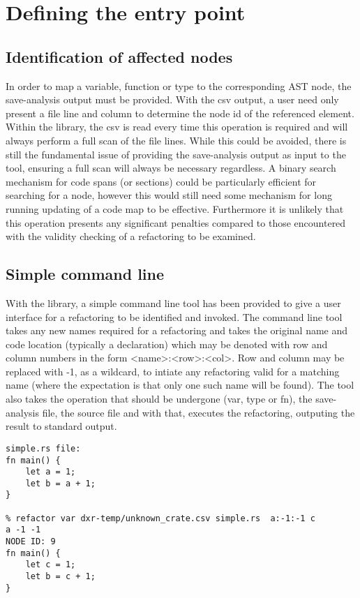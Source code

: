 
\section{Defining the entry point}
\subsection{Identification of affected nodes}
In order to map a variable, function or type to the corresponding AST node, the save-analysis output must be provided. With the csv output, a user need only present a file line and column to determine the node id of the referenced element. Within the library, the csv is read every time this operation is required and will always perform a full scan of the file lines. While this could be avoided, there is still the fundamental issue of providing the save-analysis output as input to the tool, ensuring a full scan will always be necessary regardless. A binary search mechanism for code spans (or sections) could be particularly efficient for searching for a node, however this would still need some mechanism for long running updating of a code map to be effective. Furthermore it is unlikely that this operation presents any significant penalties compared to those encountered with the validity checking of a refactoring to be examined.

\subsection{Simple command line}
With the library, a simple command line tool has been provided to give a user interface for a refactoring to be identified and invoked. The command line tool takes any new names required for a refactoring and takes the original name and code location (typically a declaration) which may be denoted with row and column numbers in the form \textless{}name\textgreater{}:\textless{}row\textgreater{}:\textless{}col\textgreater{}. Row and column may be replaced with -1, as a wildcard, to intiate any refactoring valid for a matching name (where the expectation is that only one such name will be found). The tool also takes the operation that should be undergone (var, type or fn), the save-analysis file, the source file and with that, executes the refactoring, outputing the result to standard output.

\begin{verbatim}
simple.rs file:
fn main() {
    let a = 1;
    let b = a + 1;
}

% refactor var dxr-temp/unknown_crate.csv simple.rs  a:-1:-1 c
a -1 -1
NODE ID: 9
fn main() {
    let c = 1;
    let b = c + 1;
}
\end{verbatim}

